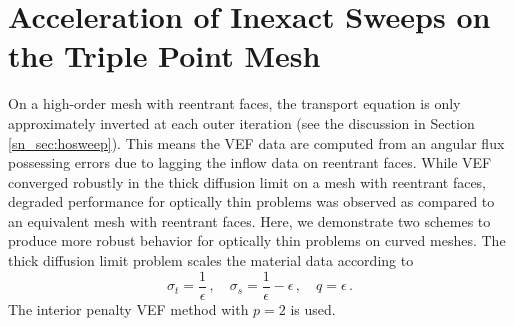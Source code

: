 \documentclass[../doc.tex]{subfiles}
\begin{document}
\section{Acceleration of Inexact Sweeps on the Triple Point Mesh}
On a high-order mesh with reentrant faces, the transport equation is only approximately inverted at each outer iteration (see the discussion in Section \ref{sn_sec:hosweep}). This means the VEF data are computed from an angular flux possessing errors due to lagging the inflow data on reentrant faces. While VEF converged robustly in the thick diffusion limit on a mesh with reentrant faces, degraded performance for optically thin problems was observed as compared to an equivalent mesh with reentrant faces. Here, we demonstrate two schemes to produce more robust behavior for optically thin problems on curved meshes. The thick diffusion limit problem scales the material data according to 
	\begin{equation}
		\sigma_t = \frac{1}{\epsilon} \,, \quad \sigma_s = \frac{1}{\epsilon} - \epsilon \,, \quad q = \epsilon \,. 
	\end{equation}
The interior penalty VEF method with $p=2$ is used. 
\end{document}
